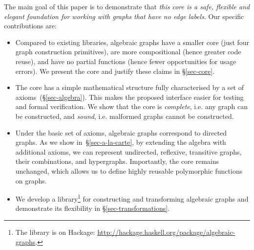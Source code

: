 The main goal of this paper is to demonstrate that \emph{this core is a safe, flexible
and elegant foundation for working with graphs that have no edge labels}. Our specific
contributions are:
\vspace{-0.25mm}
\begin{itemize}
  \item Compared to existing libraries, algebraic graphs have a smaller
  core (just four graph construction primitives), are more compositional
  (hence greater code reuse), and have no partial functions (hence fewer
  opportunities for usage errors). We present the core and justify these claims
  in \S\ref{sec-core}.

  \item The core has a simple mathematical structure fully characterised
  by a set of axioms~(\S\ref{sec-algebra}). This makes the
  proposed interface easier for testing and formal verification. We show that
  the core is \emph{complete}, i.e. any graph can be constructed, and \emph{sound},
  i.e. malformed graphs cannot be constructed.

  \item Under the basic set of axioms, algebraic graphs correspond to directed
  graphs. As we show in~\S\ref{sec-a-la-carte}, by extending
  the algebra with additional axioms, we can represent undirected,
  reflexive, transitive graphs, their combinations, and hypergraphs.
  Importantly, the core remains unchanged, which allows us to define highly
  reusable polymorphic functions on graphs.

  \item We develop a library\footnote{The library is on Hackage:
  \url{http://hackage.haskell.org/package/algebraic-graphs}.}
  for constructing and transforming algebraic graphs
  and demonstrate its flexibility in \S\ref{sec-transformations}.

\end{itemize}
\vspace{-2mm}

